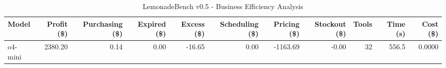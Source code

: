 \begin{table}[h]
\centering
\caption{LemonadeBench v0.5 - Business Efficiency Analysis}
\label{tab:lemonadebench_v05_efficiency}
\begin{tabular}{|l|r|r|r|r|r|r|r|r|r|r|}
\hline
\textbf{Model} & \textbf{Profit (\$)} & \textbf{Purchasing (\$)} & \textbf{Expired (\$)} & \textbf{Excess (\$)} & \textbf{Scheduling (\$)} & \textbf{Pricing (\$)} & \textbf{Stockout (\$)} & \textbf{Tools} & \textbf{Time (s)} & \textbf{Cost (\$)} \\
\hline
o4-mini & 2380.20 & 0.14 & 0.00 & -16.65 & 0.00 & -1163.69 & -0.00 & 32 & 556.5 & 0.0000 \\
\hline
\end{tabular}
\end{table}
